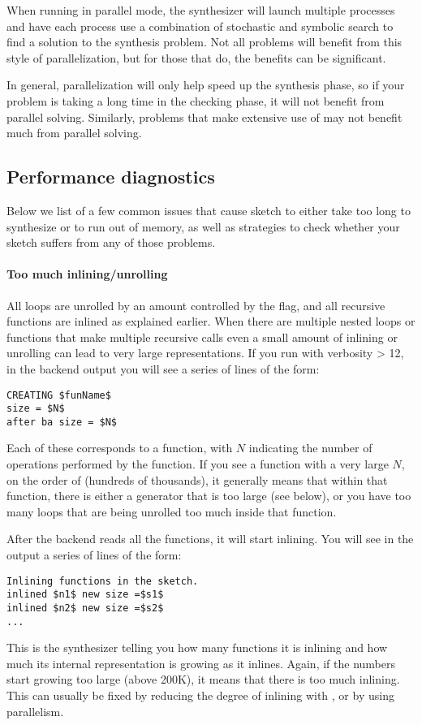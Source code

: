 When running in parallel mode, the \Sk{} synthesizer will launch multiple processes and have each process use a combination of stochastic and symbolic search to find a solution to the synthesis problem. Not all problems will benefit from this style of parallelization, but for those that do, the benefits can be significant.

In general, parallelization will only help speed up the synthesis phase, so if your problem is taking a long time in the checking phase, it will not benefit from parallel solving. Similarly, problems that make extensive use of  may not benefit much from parallel solving.


\subsection{Performance diagnostics}
Below we list of a few common issues that cause sketch to either take too long to
synthesize or to run out of memory, as well as strategies to check whether
your sketch suffers from any of those problems.

\paragraph{Too much inlining/unrolling}
All loops are unrolled by an amount controlled by the  flag, and all
recursive functions are inlined as explained earlier. When there
are multiple nested loops or functions that make multiple recursive calls even
a small amount of inlining or unrolling can lead to very large representations.
If you run with verbosity > 12, in the backend output you will see a series
of lines of the form:
\begin{lstlisting}
CREATING $funName$
size = $N$
after ba size = $N$
\end{lstlisting}
Each of these corresponds to a function, with $N$ indicating the number
of operations performed by the function. If you see a function with a very large $N$,
on the order of (hundreds of thousands), it generally means that within that
function, there is either a generator that is too large (see below),
or you have too many loops that are being unrolled too much inside that function.

After the backend reads all the functions, it will start inlining.
You will see in the output a series of lines of the form:
\begin{lstlisting}
Inlining functions in the sketch.
inlined $n1$ new size =$s1$
inlined $n2$ new size =$s2$
...
\end{lstlisting}
This is the synthesizer telling you how many functions it is inlining and
how much its internal representation is growing as it inlines. Again,
if the numbers start growing too large (above 200K), it means that there is
too much inlining. This can usually be fixed by reducing the degree of inlining
with , or by using parallelism.



